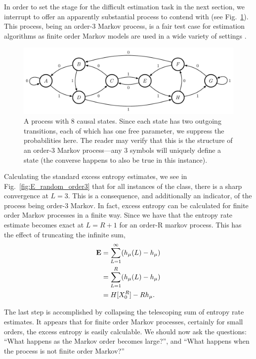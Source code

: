 In order to set the stage for the difficult estimation task in the next section, we interrupt to offer an apparently substantial process to contend with (see Fig.~\ref{fig:random_order3}). This process, being an order-3 Markov process, is a fair test case for estimation algorithms as finite order Markov models are used in a wide variety of settings .

\begin{figure}[h!]
\centering
\includegraphics[scale = 0.6]{../chapter1/figures/tex/mc3_tr}
\caption{A process with 8 causal states. Since each state has two outgoing transitions, each of which has one free parameter, we suppress the probabilities here. The reader may verify that this is the structure of an order-3 Markov process---any 3 symbols will uniquely define a state (the converse happens to also be true in this instance).}
\label{fig:random_order3}
\end{figure}

Calculating the standard excess entropy estimates, we see in Fig.~\ref{fig:E_random_order3} that for all instances of the class, there is a sharp convergence at $L=3$. This is a consequence, and additionally an indicator, of the process being order-3 Markov. In fact, excess entropy can be calculated for finite order Markov processes in a finite way. Since we have that the entropy rate estimate becomes exact at $L=R+1$ for an order-R markov process. This has the effect of truncating the infinite sum,
\begin{align*}
{\bf E} &= \sum_{L=1}^{\infty}(h_\mu(L) - h_\mu)\\
&= \sum_{L=1}^{R}(h_\mu(L) - h_\mu)\\
&= H[{X}_0^R] - R h_\mu.
\end{align*}

The last step is accomplished by collapsing the telescoping sum of entropy rate estimates. It appears that for finite order Markov processes, certainly for small orders, the excess entropy is easily calculable. We should now ask the questions: ``What happens as the Markov order becomes large?'', and ``What happens when the process is not finite order Markov?''

